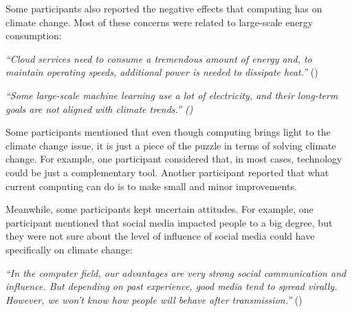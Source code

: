     Some participants also reported the negative effects that computing has on climate change. Most of these concerns were related to large-scale energy consumption:
    
    \begin{quoting}
        \textit{
        ``Cloud services need to consume a tremendous amount of energy and, to maintain operating speeds, additional power is needed to dissipate heat.''
        } ()
    \end{quoting}
    
    \begin{quoting}
        \textit{
        ``Some large-scale machine learning use a lot of electricity, and their long-term goals are not aligned with climate trends.'' ()
        }
    \end{quoting}
    
    
    Some participants mentioned that even though computing brings light to the climate change issue, it is just a piece of the puzzle in terms of solving climate change. For example, one participant considered that, in most cases, technology could be just a complementary tool. Another participant reported that what current computing can do is to make small and minor improvements. %
    
    Meanwhile, some participants kept uncertain attitudes. For example, one participant mentioned that social media impacted people to a big degree, but they were not sure about the level of influence of social media could have specifically on climate change:
    
    \begin{quoting}
        \textit{
        ``In the computer field, our advantages are very strong social communication and influence. But depending on past experience, good media tend to spread virally. However, we won't know how people will behave after transmission.'' 
        }()
    \end{quoting}
    
